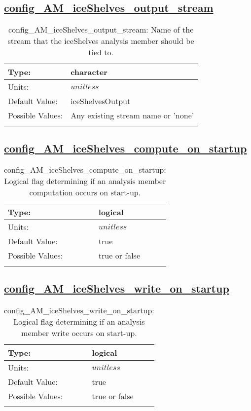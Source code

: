 \subsection[config\_AM\_iceShelves\_output\_stream]{\hyperref[sec:nm_tab_AM_iceShelves]{config\_AM\_iceShelves\_output\_stream}}
\label{subsec:nm_sec_config_AM_iceShelves_output_stream}
\begin{center}
\begin{longtable}{| p{2.0in} || p{4.0in} |}
    \hline
    Type: & character \\
    \hline
    Units: & $unitless$ \\
    \hline
    Default Value: & iceShelvesOutput \\
    \hline
    Possible Values: & Any existing stream name or 'none' \\
    \hline
    \caption{config\_AM\_iceShelves\_output\_stream: Name of the stream that the iceShelves analysis member should be tied to.}
\end{longtable}
\end{center}
\subsection[config\_AM\_iceShelves\_compute\_on\_startup]{\hyperref[sec:nm_tab_AM_iceShelves]{config\_AM\_iceShelves\_compute\_on\_startup}}
\label{subsec:nm_sec_config_AM_iceShelves_compute_on_startup}
\begin{center}
\begin{longtable}{| p{2.0in} || p{4.0in} |}
    \hline
    Type: & logical \\
    \hline
    Units: & $unitless$ \\
    \hline
    Default Value: & true \\
    \hline
    Possible Values: & true or false \\
    \hline
    \caption{config\_AM\_iceShelves\_compute\_on\_startup: Logical flag determining if an analysis member computation occurs on start-up.}
\end{longtable}
\end{center}
\subsection[config\_AM\_iceShelves\_write\_on\_startup]{\hyperref[sec:nm_tab_AM_iceShelves]{config\_AM\_iceShelves\_write\_on\_startup}}
\label{subsec:nm_sec_config_AM_iceShelves_write_on_startup}
\begin{center}
\begin{longtable}{| p{2.0in} || p{4.0in} |}
    \hline
    Type: & logical \\
    \hline
    Units: & $unitless$ \\
    \hline
    Default Value: & true \\
    \hline
    Possible Values: & true or false \\
    \hline
    \caption{config\_AM\_iceShelves\_write\_on\_startup: Logical flag determining if an analysis member write occurs on start-up.}
\end{longtable}
\end{center}
